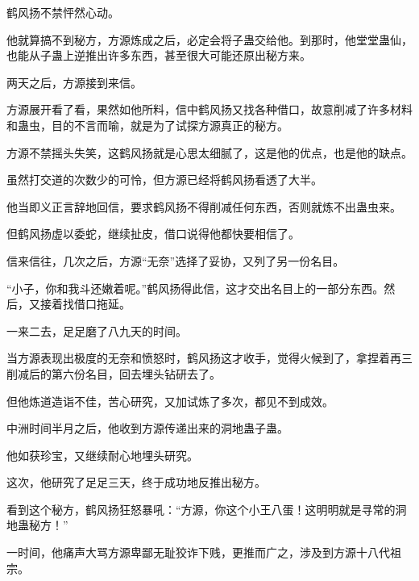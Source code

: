\begin{this_body}
鹤风扬不禁怦然心动。

他就算搞不到秘方，方源炼成之后，必定会将子蛊交给他。到那时，他堂堂蛊仙，也能从子蛊上逆推出许多东西，甚至很大可能还原出秘方来。

两天之后，方源接到来信。

方源展开看了看，果然如他所料，信中鹤风扬又找各种借口，故意削减了许多材料和蛊虫，目的不言而喻，就是为了试探方源真正的秘方。

方源不禁摇头失笑，这鹤风扬就是心思太细腻了，这是他的优点，也是他的缺点。

虽然打交道的次数少的可怜，但方源已经将鹤风扬看透了大半。

他当即义正言辞地回信，要求鹤风扬不得削减任何东西，否则就炼不出蛊虫来。

但鹤风扬虚以委蛇，继续扯皮，借口说得他都快要相信了。

信来信往，几次之后，方源“无奈”选择了妥协，又列了另一份名目。

“小子，你和我斗还嫩着呢。”鹤风扬得此信，这才交出名目上的一部分东西。然后，又接着找借口拖延。

一来二去，足足磨了八九天的时间。

当方源表现出极度的无奈和愤怒时，鹤风扬这才收手，觉得火候到了，拿捏着再三削减后的第六份名目，回去埋头钻研去了。

但他炼道造诣不佳，苦心研究，又加试炼了多次，都见不到成效。

中洲时间半月之后，他收到方源传递出来的洞地蛊子蛊。

他如获珍宝，又继续耐心地埋头研究。

这次，他研究了足足三天，终于成功地反推出秘方。

看到这个秘方，鹤风扬狂怒暴吼：“方源，你这个小王八蛋！这明明就是寻常的洞地蛊秘方！”

一时间，他痛声大骂方源卑鄙无耻狡诈下贱，更推而广之，涉及到方源十八代祖宗。

\end{this_body}

